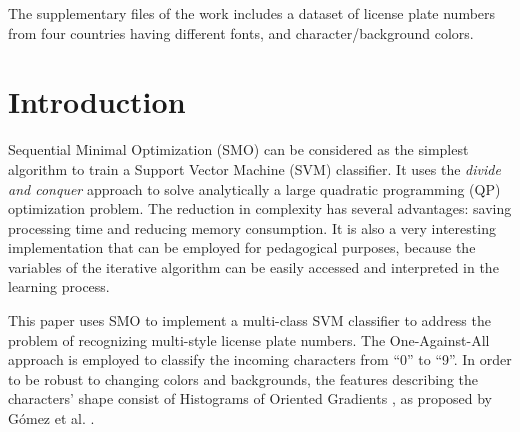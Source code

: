 \documentclass{ipol}
\begin{document}

\begin{ipolSupp}
The supplementary files of the work includes a dataset of license plate numbers from four countries having different fonts, and character/background colors.
\end{ipolSupp}




\section{Introduction}

Sequential Minimal Optimization (SMO) \cite{Platt:1998} can be considered as the simplest algorithm to train a Support Vector Machine (SVM) classifier.
It uses the \textit{divide and conquer} approach to solve analytically a large quadratic programming (QP) optimization problem.
The reduction in complexity has several advantages: saving processing time and reducing memory consumption.
It is also a very interesting implementation that can be employed for pedagogical purposes, because the variables of the iterative algorithm can be easily accessed and interpreted in the learning process.

This paper uses SMO to implement a multi-class SVM classifier to address the problem of recognizing multi-style license plate numbers.
The One-Against-All approach is employed to classify the incoming characters from ``0'' to ``9''.
In order to be robust to changing colors and backgrounds, the features describing the characters' shape consist of Histograms of Oriented Gradients \cite{Dalal:2005}, as proposed by G\'{o}mez et al. \cite{Gomez:2011}.

\end{document}
